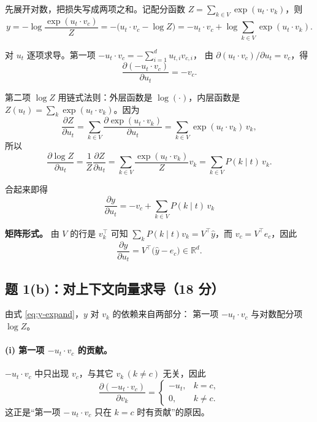 \documentclass[11pt,a4paper]{article}
\begin{document}
先展开对数，把损失写成两项之和。记配分函数
$Z=\sum_{k\in V}\exp(u_t\cdot v_k)$，则
\begin{equation}
y=-\log\frac{\exp(u_t\cdot v_c)}{Z}
=-\bigl(u_t\cdot v_c-\log Z\bigr)
=-u_t\cdot v_c+\log\sum_{k\in V}\exp(u_t\cdot v_k).
\label{eq:y-expand}
\end{equation}

对 $u_t$ 逐项求导。第一项 $-u_t\cdot v_c=-\sum_{i=1}^d u_{t,i}v_{c,i}$，
由 $\partial(u_t\cdot v_c)/\partial u_t=v_c$，得
\begin{equation}
\frac{\partial(-u_t\cdot v_c)}{\partial u_t}=-v_c .
\end{equation}

第二项 $\log Z$ 用链式法则：外层函数是 $\log(\cdot)$，内层函数是
$Z(u_t)=\sum_{k}\exp(u_t\cdot v_k)$。因为
\begin{equation}
\frac{\partial Z}{\partial u_t}
=\sum_{k\in V}\frac{\partial\exp(u_t\cdot v_k)}{\partial u_t}
=\sum_{k\in V}\exp(u_t\cdot v_k)\,v_k,
\end{equation}
所以
\begin{equation}
\frac{\partial\log Z}{\partial u_t}
=\frac{1}{Z}\frac{\partial Z}{\partial u_t}
=\sum_{k\in V}\frac{\exp(u_t\cdot v_k)}{Z}v_k
=\sum_{k\in V}P(k\mid t)\,v_k .
\end{equation}

合起来即得
\begin{equation}
\boxed{\;\frac{\partial y}{\partial u_t}
=-v_c+\sum_{k\in V}P(k\mid t)\,v_k\;}
\label{eq:grad-u}
\end{equation}

\textbf{矩阵形式。}
由 $V$ 的行是 $v_k^\top$ 可知
$\sum_{k}P(k\mid t)v_k=V^\top\hat y$，而 $v_c=V^\top e_c$，因此
\begin{equation}
\frac{\partial y}{\partial u_t}
=V^\top\bigl(\hat y-e_c\bigr)
\in\mathbb{R}^{d}.
\label{eq:grad-u-matrix}
\end{equation}

\subsection{题 1(b)：对上下文向量求导（18 分）}

由式 \eqref{eq:y-expand}，$y$ 对 $v_k$ 的依赖来自两部分：
第一项 $-u_t\cdot v_c$ 与对数配分项 $\log Z$。

\paragraph{(i) 第一项 $-u_t\cdot v_c$ 的贡献。}
$-u_t\cdot v_c$ 中只出现 $v_c$，与其它 $v_k\,(k\neq c)$ 无关，因此
\begin{equation}
\frac{\partial(-u_t\cdot v_c)}{\partial v_k}
=\begin{cases}
-u_t, & k=c,\\[2pt]
0, & k\neq c .
\end{cases}
\end{equation}
这正是“第一项 $-\,u_t\cdot v_c$ 只在 $k=c$ 时有贡献”的原因。
\end{document}
